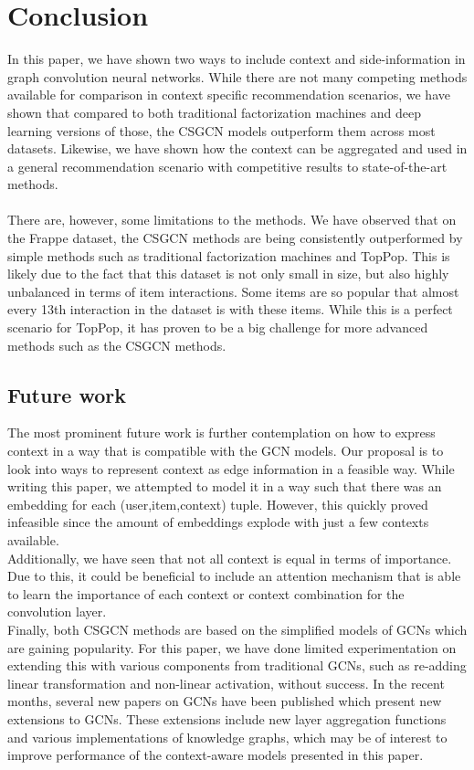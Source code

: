 \section{Conclusion}\label{sec:conclusion}
In this paper, we have shown two ways to include context and side-information in graph convolution neural networks.
While there are not many competing methods available for comparison in context specific recommendation scenarios, we have shown that compared to both traditional factorization machines and deep learning versions of those, the CSGCN models outperform them across most datasets.
Likewise, we have shown how the context can be aggregated and used in a general recommendation scenario with competitive results to state-of-the-art methods.
\\\\
There are, however, some limitations to the methods.
We have observed that on the Frappe dataset, the CSGCN methods are being consistently outperformed by simple methods such as traditional factorization machines and TopPop.
This is likely due to the fact that this dataset is not only small in size, but also highly unbalanced in terms of item interactions.
Some items are so popular that almost every 13th interaction in the dataset is with these items.
While this is a perfect scenario for TopPop, it has proven to be a big challenge for more advanced methods such as the CSGCN methods.

\subsection{Future work}
The most prominent future work is further contemplation on how to express context in a way that is compatible with the GCN models.
Our proposal is to look into ways to represent context as edge information in a feasible way.
While writing this paper, we attempted to model it in a way such that there was an embedding for each (user,item,context) tuple.
However, this quickly proved infeasible since the amount of embeddings explode with just a few contexts available.
\\
Additionally, we have seen that not all context is equal in terms of importance.
Due to this, it could be beneficial to include an attention mechanism that is able to learn the importance of each context or context combination for the convolution layer.
\\
Finally, both CSGCN methods are based on the simplified models of GCNs which are gaining popularity.
For this paper, we have done limited experimentation on extending this with various components from traditional GCNs, such as re-adding linear transformation and non-linear activation, without success.
In the recent months, several new papers on GCNs have been published which present new extensions to GCNs.
These extensions include new layer aggregation functions and various implementations of knowledge graphs, which may be of interest to improve performance of the context-aware models presented in this paper.

